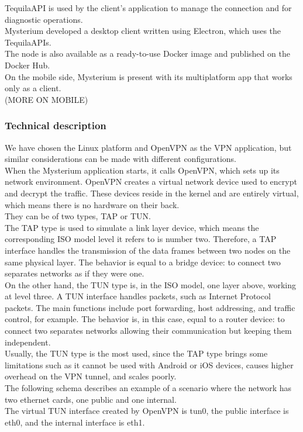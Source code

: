 \documentclass[12pt]{article}
\begin{document}
	TequilaAPI is used by the client's application to manage the connection and for diagnostic operations.\\
	Mysterium developed a desktop client written using Electron, which uses the TequilaAPIs.\\
	The node is also available as a ready-to-use Docker image and published on the Docker Hub.\\
	On the mobile side, Mysterium is present with its multiplatform app that works only as a client.\\
	(MORE ON MOBILE)

	\subsubsection{Technical description}

	We have chosen the Linux platform and OpenVPN as the VPN application, but similar considerations can be made with different configurations.\\
	When the Mysterium application starts, it calls OpenVPN, which sets up its network environment. OpenVPN creates a virtual network device used to encrypt and decrypt the traffic. These devices reside in the kernel and are entirely virtual, which means there is no hardware on their back.\\
	They can be of two types, TAP or TUN.\\
	The TAP type is used to simulate a link layer device, which means the corresponding ISO model level it refers to is number two. Therefore, a TAP interface handles the transmission of the data frames between two nodes on the same physical layer. The behavior is equal to a bridge device: to connect two separates networks as if they were one.\\
	On the other hand, the TUN type is, in the ISO model, one layer above, working at level three. A TUN interface handles packets, such as Internet Protocol packets. The main functions include port forwarding, host addressing, and traffic control, for example. The behavior is, in this case, equal to a router device: to connect two separates networks allowing their communication but keeping them independent.\\
	Usually, the TUN type is the most used, since the TAP type brings some limitations such as it cannot be used with Android or iOS devices, causes higher overhead on the VPN tunnel, and scales poorly.\\
	The following schema describes an example of a scenario where the network has two ethernet cards, one public and one internal.\\
	The virtual TUN interface created by OpenVPN is tun0, the public interface is eth0, and the internal interface is eth1.\\
\end{document}
